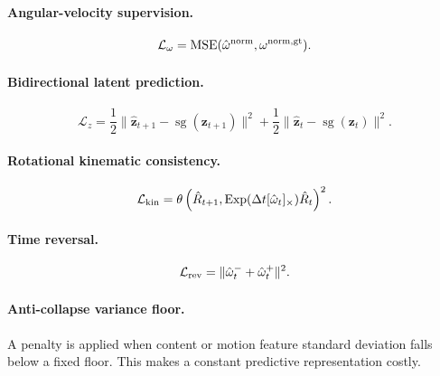 \documentclass[11pt,a4paper]{article}
\newcommand{\Exp}{\operatorname{Exp}}
\newcommand{\sg}{\operatorname{sg}}
\newcommand{\vect}[1]{\mathbf{#1}}
\begin{document}
\paragraph{Angular-velocity supervision.}
\begin{equation}
\mathcal L_\omega=\operatorname{MSE}(\hat{\vect{\omega}}^{\rm norm},\vect{\omega}^{\rm norm,gt}).
\end{equation}

\paragraph{Bidirectional latent prediction.}
\begin{equation}
\mathcal L_z=\frac12\|\hat{\vect{z}}_{t+1}-\sg(\vect{z}_{t+1})\|^2+
\frac12\|\hat{\vect{z}}_t-\sg(\vect{z}_t)\|^2.
\end{equation}

\paragraph{Rotational kinematic consistency.}
\begin{equation}
\mathcal L_{\rm kin}=\theta\left(\hat{R}_{t+1},\Exp(\Delta t[\hat{\vect{\omega}}_t]_\times)\hat{R}_t\right)^2.
\end{equation}

\paragraph{Time reversal.}
\begin{equation}
\mathcal L_{\rm rev}=\|\hat{\vect{\omega}}_t^-+\hat{\vect{\omega}}_t^+\|^2.
\end{equation}

\paragraph{Anti-collapse variance floor.}
A penalty is applied when content or motion feature standard deviation falls below a fixed floor. This makes a constant predictive representation costly.
\end{document}
